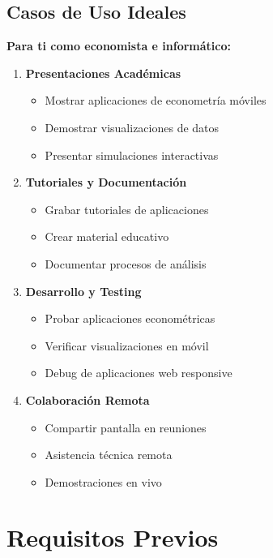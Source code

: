 \documentclass[
  doc,
  floatsintext,
  longtable,
  a4paper,
  nolmodern,
  notxfonts,
  notimes,
  12pt,
  colorlinks=true,linkcolor=blue,citecolor=blue,urlcolor=blue]{apa7}
\providecommand{\tightlist}{%
  \setlength{\itemsep}{0pt}\setlength{\parskip}{0pt}}
\begin{document}
\subsection{Casos de Uso Ideales}\label{casos-de-uso-ideales}

\textbf{Para ti como economista e informático:}

\begin{enumerate}
\def\labelenumi{\arabic{enumi}.}
\item
  \textbf{Presentaciones Académicas}

  \begin{itemize}
  \tightlist
  \item
    Mostrar aplicaciones de econometría móviles
  \item
    Demostrar visualizaciones de datos
  \item
    Presentar simulaciones interactivas
  \end{itemize}
\item
  \textbf{Tutoriales y Documentación}

  \begin{itemize}
  \tightlist
  \item
    Grabar tutoriales de aplicaciones
  \item
    Crear material educativo
  \item
    Documentar procesos de análisis
  \end{itemize}
\item
  \textbf{Desarrollo y Testing}

  \begin{itemize}
  \tightlist
  \item
    Probar aplicaciones econométricas
  \item
    Verificar visualizaciones en móvil
  \item
    Debug de aplicaciones web responsive
  \end{itemize}
\item
  \textbf{Colaboración Remota}

  \begin{itemize}
  \tightlist
  \item
    Compartir pantalla en reuniones
  \item
    Asistencia técnica remota
  \item
    Demostraciones en vivo
  \end{itemize}
\end{enumerate}

\section{Requisitos Previos}\label{requisitos-previos}
\end{document}
